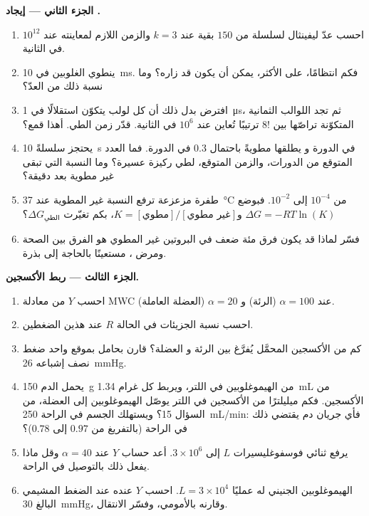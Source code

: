 \begin{problem}
\medskip
\noindent\textbf{الجزء الثاني --- إيجاد .}
\begin{enumerate}[resume]
  \item احسب عدّ ليفينثال لسلسلة من $150$ بقية عند $k = 3$
        والزمن اللازم لمعاينته عند $10^{12}$ في الثانية.
  \item ينطوي الغلوبين في \qty{10}{ms}. فكم انتظامًا، على
        الأكثر، يمكن أن يكون قد زاره؟ وما نسبة ذلك من العدّ؟
  \item افترض بدل ذلك أن كل لولب يتكوّن استقلالًا في
        \qty{1}{\micro s}، ثم تجد اللوالب الثمانية المتكوّنة
        تراصّها بين $8!$ ترتيبًا تُعاين عند $10^{6}$ في الثانية.
        قدّر زمن الطي. أهذا قمع؟
  \item يحتجز  سلسلةً \qty{10}{s} في الدورة و
        يطلقها مطويةً باحتمال $0.3$ في الدورة. فما
        العدد المتوقع من الدورات، والزمن المتوقع، لطي
        ركيزة عسيرة؟ وما النسبة التي تبقى غير مطوية بعد
        دقيقة؟
  \item طفرة مزعزعة ترفع النسبة غير المطوية عند
        \qty{37}{\celsius} من $10^{-4}$ إلى $10^{-2}$. فبوضع $\Delta G =
        -RT\ln(K)$ و$K = [\text{مطوي}]/[\text{غير مطوي}]$، بكم
        تغيّرت $\Delta G_{\text{الطي}}$؟
  \item فسّر لماذا قد يكون فرق مئة ضعف في البروتين غير المطوي
        هو الفرق بين الصحة ومرض ، مستعينًا
        بالحاجة إلى بذرة.
\end{enumerate}

\medskip
\noindent\textbf{الجزء الثالث --- ربط الأكسجين.}
\begin{enumerate}[resume]
  \item احسب $Y$ من معادلة MWC عند $\alpha = 100$ (الرئة) و
        $\alpha = 20$ (العضلة العاملة).
  \item احسب نسبة الجزيئات في الحالة $R$ عند هذين
        الضغطين.
  \item كم من الأكسجين المحمَّل يُفرَّغ بين الرئة و
        العضلة؟ قارن بحامل بموقع واحد ضغط نصف إشباعه
        \qty{26}{mmHg}.
  \item يحمل الدم \qty{150}{g} من الهيموغلوبين في اللتر، ويربط كل غرام
        \qty{1.34}{mL} من الأكسجين. فكم ميليلترًا من
        الأكسجين في اللتر يوصّل الهيموغلوبين إلى العضلة، من
        السؤال 15؟ ويستهلك الجسم في الراحة \qty{250}{mL/min}: فأي
        جريان دم يقتضي ذلك في الراحة (بالتفريغ من $0.97$ إلى $0.78$)؟
  \item يرفع ثنائي فوسفوغليسيرات $L$ إلى $3\times 10^{6}$. أعد حساب
        $Y$ عند $\alpha = 40$ وقل ماذا يفعل ذلك بالتوصيل في
        الراحة.
  \item الهيموغلوبين الجنيني له عمليًا $L = 3\times 10^{4}$. احسب
        $Y$ عنده عند الضغط المشيمي البالغ \qty{30}{mmHg}، وقارنه
        بالأمومي، وفسّر الانتقال.
\end{enumerate}


\end{problem}

